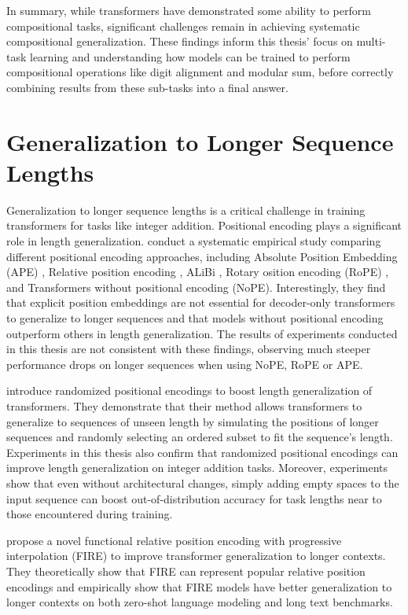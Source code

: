 In summary, while transformers have demonstrated some ability to perform compositional tasks, significant challenges remain in achieving systematic compositional generalization. These findings inform this thesis' focus on multi-task learning and understanding how models can be trained to perform compositional operations like digit alignment and modular sum, before correctly combining results from these sub-tasks into a final answer.

\section{Generalization to Longer Sequence Lengths}\label{sec:sota_generalization_to_longer_sequences}

Generalization to longer sequence lengths is a critical challenge in training transformers for tasks like integer addition. Positional encoding plays a significant role in length generalization. \cite{kazemnejad_impact_2023} conduct a systematic empirical study comparing different positional encoding approaches, including Absolute Position Embedding (APE) \parencite{vaswani_attention_2017}, Relative position encoding \parencite{shaw_self-attention_2018}, ALiBi \parencite{alibi}, Rotary osition encoding (RoPE) \parencite{su_roformer_2024}, and Transformers without positional encoding (NoPE). Interestingly, they find that explicit position embeddings are not essential for decoder-only transformers to generalize to longer sequences and that models without positional encoding outperform others in length generalization. The results of experiments conducted in this thesis are not consistent with these findings, observing much steeper performance drops on longer sequences when using NoPE, RoPE or APE.

\cite{ruoss_randomized_2023} introduce randomized positional encodings to boost length generalization of transformers. They demonstrate that their method allows transformers to generalize to sequences of unseen length by simulating the positions of longer sequences and randomly selecting an ordered subset to fit the sequence's length. Experiments in this thesis also confirm that randomized positional encodings can improve length generalization on integer addition tasks. Moreover, experiments show that even without architectural changes, simply adding empty spaces to the input sequence can boost out-of-distribution accuracy for task lengths near to those encountered during training.

\cite{li_functional_2024} propose a novel functional relative position encoding with progressive interpolation (FIRE) to improve transformer generalization to longer contexts. They theoretically show that FIRE can represent popular relative position encodings and empirically show that FIRE models have better generalization to longer contexts on both zero-shot language modeling and long text benchmarks.

